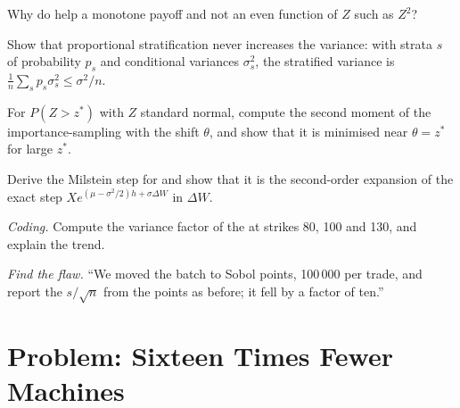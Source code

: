 \begin{exercise}[$\star$]\label{exo:qm:monte-carlo:3}
Why do  help a monotone payoff and not an even function of $Z$ such as $Z^2$?
\end{exercise}

\begin{exercise}[$\star\star$]\label{exo:qm:monte-carlo:4}
Show that proportional stratification never increases the variance: with strata $s$ of probability $p_s$ and conditional variances $\sigma_s^2$, the stratified variance is $\frac1n\sum_sp_s\sigma_s^2 \le
\sigma^2/n$.
\end{exercise}

\begin{exercise}[$\star\star$]\label{exo:qm:monte-carlo:5}
For $P(Z > z^*)$ with $Z$ standard normal, compute the second moment of the importance-sampling  with the shift $\theta$, and show that it is minimised near $\theta = z^*$ for large $z^*$.
\end{exercise}

\begin{exercise}[$\star\star$]\label{exo:qm:monte-carlo:6}
Derive the Milstein step for  and show that it is the second-order expansion of the exact step $X e^{(\mu - \sigma^2/2)h + \sigma\Delta W}$ in $\Delta W$.
\end{exercise}

\begin{exercise}[$\star\star\star$]\label{exo:qm:monte-carlo:7}
\emph{Coding.} Compute the variance factor of the  at strikes 80, 100 and 130, and explain the trend.
\end{exercise}

\begin{exercise}[$\star\star\star$]\label{exo:qm:monte-carlo:8}
\emph{Find the flaw.} ``We moved the batch to Sobol points, 100\,000 per trade, and report the  $s/\sqrt n$ from the points as before; it fell by a factor of ten.''
\end{exercise}

\section{Problem: Sixteen Times Fewer Machines}

